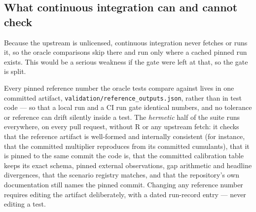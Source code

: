\subsection{What continuous integration can and cannot check}

Because the upstream is unlicensed, continuous integration never fetches or runs it, so the oracle comparisons skip there and run only where a cached pinned run exists. This would be a serious weakness if the gate were left at that, so the gate is split.

Every pinned reference number the oracle tests compare against lives in one committed artifact, \texttt{validation/reference\_outputs.json}, rather than in test code --- so that a local run and a CI run gate identical numbers, and no tolerance or reference can drift silently inside a test. The \emph{hermetic} half of the suite runs everywhere, on every pull request, without R or any upstream fetch: it checks that the reference artifact is well-formed and internally consistent (for instance, that the committed multiplier reproduces from its committed cumulants), that it is pinned to the same commit the code is, that the committed calibration table keeps its exact schema, pinned external observations, gap arithmetic and headline divergences, that the scenario registry matches, and that the repository's own documentation still names the pinned commit. Changing any reference number requires editing the artifact deliberately, with a dated run-record entry --- never editing a test.

